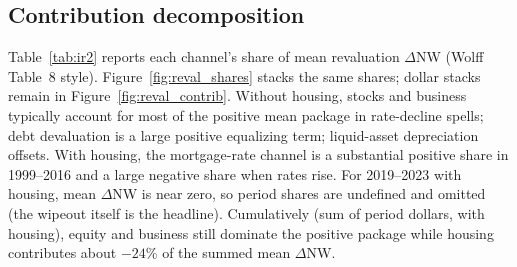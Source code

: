 \documentclass[11pt]{article}
\begin{document}
\subsection{Contribution decomposition}

Table~\ref{tab:ir2} reports each channel's share of mean revaluation $\Delta$NW (Wolff Table~8 style). Figure~\ref{fig:reval_shares} stacks the same shares; dollar stacks remain in Figure~\ref{fig:reval_contrib}. Without housing, stocks and business typically account for most of the positive mean package in rate-decline spells; debt devaluation is a large positive equalizing term; liquid-asset depreciation offsets. With housing, the mortgage-rate channel is a substantial positive share in 1999--2016 and a large negative share when rates rise. For 2019--2023 with housing, mean $\Delta$NW is near zero, so period shares are undefined and omitted (the wipeout itself is the headline). Cumulatively (sum of period dollars, with housing), equity and business still dominate the positive package while housing contributes about $-24\%$ of the summed mean $\Delta$NW.
\end{document}
